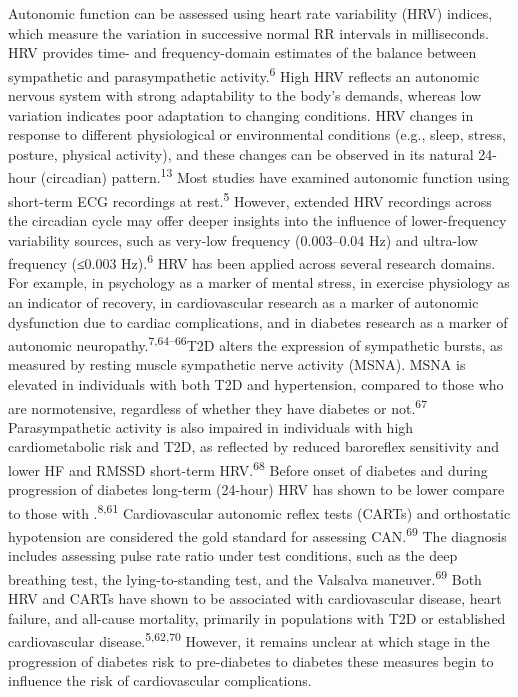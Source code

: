 \documentclass[
  a4paper,
  headsepline=true,
  open=left]{scrbook}
\begin{document}
Autonomic function can be assessed using heart rate variability (HRV)
indices, which measure the variation in successive normal RR intervals
in milliseconds. HRV provides time- and frequency-domain estimates of
the balance between sympathetic and parasympathetic
activity.\textsuperscript{6} High HRV reflects an autonomic nervous
system with strong adaptability to the body's demands, whereas low
variation indicates poor adaptation to changing conditions. HRV changes
in response to different physiological or environmental conditions
(e.g., sleep, stress, posture, physical activity), and these changes can
be observed in its natural 24-hour (circadian)
pattern.\textsuperscript{13} Most studies have examined autonomic
function using short-term ECG recordings at rest.\textsuperscript{5}
However, extended HRV recordings across the circadian cycle may offer
deeper insights into the influence of lower-frequency variability
sources, such as very-low frequency (0.003--0.04 Hz) and ultra-low
frequency (≤0.003 Hz).\textsuperscript{6} HRV has been applied across
several research domains. For example, in psychology as a marker of
mental stress, in exercise physiology as an indicator of recovery, in
cardiovascular research as a marker of autonomic dysfunction due to
cardiac complications, and in diabetes research as a marker of autonomic
neuropathy.\textsuperscript{7,64--66}T2D alters the expression of
sympathetic bursts, as measured by resting muscle sympathetic nerve
activity (MSNA). MSNA is elevated in individuals with both T2D and
hypertension, compared to those who are normotensive, regardless of
whether they have diabetes or not.\textsuperscript{67} Parasympathetic
activity is also impaired in individuals with high cardiometabolic risk
and T2D, as reflected by reduced baroreflex sensitivity and lower HF and
RMSSD short-term HRV.\textsuperscript{68} Before onset of diabetes and
during progression of diabetes long-term (24-hour) HRV has shown to be
lower compare to those with .\textsuperscript{8,61} Cardiovascular
autonomic reflex tests (CARTs) and orthostatic hypotension are
considered the gold standard for assessing CAN.\textsuperscript{69} The
diagnosis includes assessing pulse rate ratio under test conditions,
such as the deep breathing test, the lying-to-standing test, and the
Valsalva maneuver.\textsuperscript{69} Both HRV and CARTs have shown to
be associated with cardiovascular disease, heart failure, and all-cause
mortality, primarily in populations with T2D or established
cardiovascular disease.\textsuperscript{5,62,70} However, it remains
unclear at which stage in the progression of diabetes risk to
pre-diabetes to diabetes these measures begin to influence the risk of
cardiovascular complications.
\end{document}
